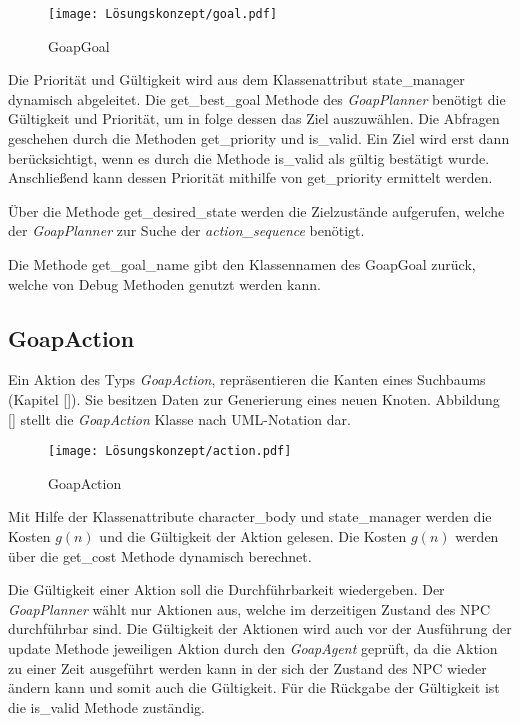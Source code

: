 \begin{figure}[t]
  \centering
  \texttt{[image: Lösungskonzept/goal.pdf]}
	\captionsetup{justification=justified, format=plain}
  \caption{GoapGoal}
  \label{fig:GoapGoal}
\end{figure}

Die Priorität und Gültigkeit wird aus dem Klassenattribut state\_manager dynamisch abgeleitet. Die get\_best\_goal Methode des \textit{GoapPlanner} benötigt die Gültigkeit und Priorität, um in folge dessen das Ziel auszuwählen. Die Abfragen geschehen durch die Methoden get\_priority und is\_valid. Ein Ziel wird erst dann berücksichtigt, wenn es durch die Methode is\_valid als gültig bestätigt wurde. Anschlie\ss{}end kann dessen Priorität mithilfe von get\_priority ermittelt werden. 

\"{U}ber die Methode get\_desired\_state werden die Zielzustände aufgerufen, welche der \textit{GoapPlanner} zur Suche der \textit{action\_sequence} benötigt. 

Die Methode get\_goal\_name gibt den Klassennamen des GoapGoal zurück, welche von Debug Methoden genutzt werden kann.









\subsection{GoapAction}
\label{chap:goapaction uml}

Ein Aktion des Typs \textit{GoapAction}, repräsentieren die Kanten eines Suchbaums (Kapitel \ref{}). Sie besitzen Daten zur Generierung eines neuen Knoten. Abbildung \ref{} stellt die \textit{GoapAction} Klasse nach UML-Notation dar.

\begin{figure}[h]
  \centering
  \texttt{[image: Lösungskonzept/action.pdf]}
	\captionsetup{justification=justified, format=plain}
  \caption{GoapAction}
  \label{fig:GoapAction}
\end{figure}

Mit Hilfe der Klassenattribute character\_body und state\_manager werden die Kosten $g(n)$ und die Gültigkeit der Aktion gelesen. Die Kosten $g(n)$ werden über die get\_cost Methode dynamisch berechnet.

Die Gültigkeit einer Aktion soll die Durchführbarkeit wiedergeben. Der \textit{GoapPlanner} wählt nur Aktionen aus, welche im derzeitigen Zustand des NPC durchführbar sind. Die Gültigkeit der Aktionen wird auch vor der Ausführung der update Methode jeweiligen Aktion durch den \textit{GoapAgent} geprüft, da die Aktion zu einer Zeit ausgeführt werden kann in der sich der Zustand des NPC wieder ändern kann und somit auch die Gültigkeit. Für die Rückgabe der Gültigkeit ist die is\_valid Methode zuständig.

